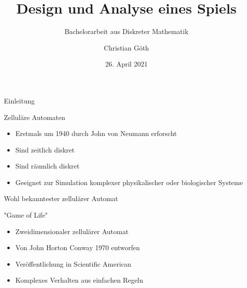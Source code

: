 \documentclass[aspectratio=169]{beamer}
\title[Zelluläre Automaten]{Design und Analyse eines Spiels}
\subtitle{Bachelorarbeit aus Diskreter Mathematik}
\author[C. Göth]{Christian Göth}
\institute[TU Wien]{TU Wien, Vienna, Austria}
\date{26. April 2021}
\begin{document}
\begin{frame}
    \titlepage
\end{frame}



  \begin{frame}{Einleitung}

    \begin{block}{Zelluläre Automaten}
      \begin{itemize}
        \item Erstmals um 1940 durch John von Neumann erforscht \\ %
        \item Sind zeitlich diskret \\
        \item Sind räumlich diskret \\
        \item Geeignet zur Simulation komplexer physikalischer oder biologischer Systeme
      \end{itemize}
    \end{block}

  \end{frame}



  \begin{frame}{Wohl bekanntester zellulärer Automat}
    \begin{block}{"Game of Life"}
      \begin{itemize}
        \item Zweidimensionaler zellulärer Automat
        \item Von John Horton Conway 1970 entworfen %
        \item Veröffentlichung in Scientific American %
        \item Komplexes Verhalten aus einfachen Regeln
      \end{itemize}
    \end{block}

  \end{frame}
\end{document}
